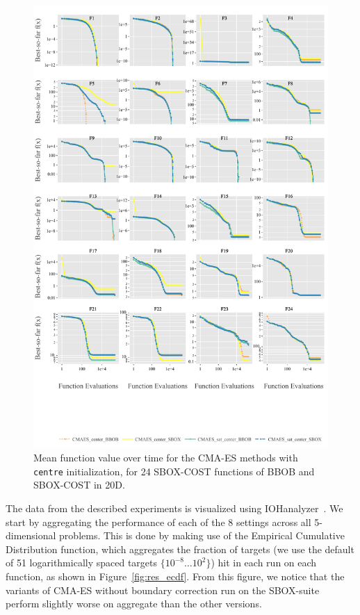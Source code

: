 \documentclass[sigconf=true, nonacm=false, review=true, anonymous = false,screen=true]{acmart}
\begin{document}
\begin{figure}
 \includegraphics[width=.95\linewidth,trim=8mm 5mm 4mm 305mm,clip]{Figures/FCE_Mult-2023-03-30 (1).pdf}
 \caption{Mean function value over time for the CMA-ES methods with \texttt{centre} initialization, for 24 SBOX-COST functions of BBOB and SBOX-COST in 20D.}\label{fig:res_ert}
\end{figure}




The data from the described experiments is visualized using IOHanalyzer~\cite{IOHanalyzer}. We start by aggregating the performance of each of the 8 settings across all 5-dimensional problems. This is done by making use of the Empirical Cumulative Distribution function, which aggregates the fraction of targets (we use the default of 51 logarithmically spaced targets $\{10^{-8}\dots10^{2}\}$) hit in each run on each function, as shown in Figure~\ref{fig:res_ecdf}. From this figure, we notice that the variants of CMA-ES without boundary correction run on the SBOX-suite perform slightly worse on aggregate than the other versions. 
\end{document}
